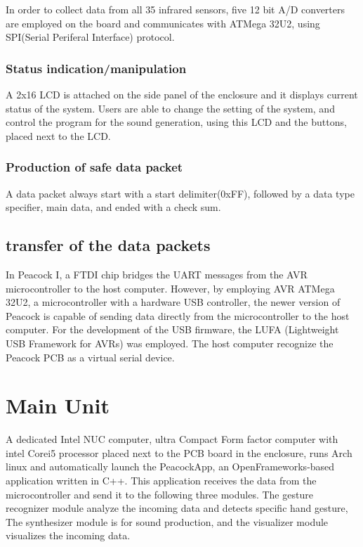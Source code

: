 \documentclass{nime-alternate}
\begin{document}
In order to collect data from all 35 infrared sensors, five 12 bit A/D converters are employed on the board and communicates with ATMega 32U2, using SPI(Serial Periferal Interface) protocol.

\subsubsection{Status indication/manipulation} %

A 2x16 LCD is attached on the side panel of the enclosure and it displays current status of the system. Users are able to change the setting of the system, and control the program for the sound generation, using this LCD and the buttons, placed next to the LCD.

\subsubsection{Production of safe data packet} %

A data packet always start with a start delimiter(0xFF), followed by a data type specifier, main data, and ended with a check sum. 

\subsection{transfer of the data packets} %

In Peacock I, a FTDI chip bridges the UART messages from the AVR microcontroller to the host computer.
However, by employing AVR ATMega 32U2, a microcontroller with a hardware USB controller, the newer version of Peacock is capable of sending data directly from the microcontroller to the host computer. For the development of the USB firmware, the LUFA (Lightweight USB Framework for AVRs)\cite{camera:lufa} was employed. The host computer recognize the Peacock PCB as a virtual serial device.

\section{Main Unit} %
A dedicated Intel NUC computer, ultra Compact Form factor computer with intel Corei5 processor placed next to the PCB board in the enclosure, runs Arch linux and automatically launch the PeacockApp, an OpenFrameworks\cite{openframeworks}-based application written in C++. This application receives the data from the microcontroller and send it to the following three modules. The gesture recognizer module analyze the incoming data and detects specific hand gesture, The synthesizer module is for sound production, and the visualizer module visualizes the incoming data.
\end{document}
